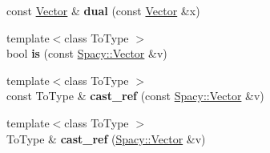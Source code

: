\begin{DoxyCompactItemize}
\item 
\hypertarget{namespaceSpacy_a58c983157e71cf6009ed046a3adea1b3}{}const \hyperlink{classSpacy_1_1Vector}{Vector} \& {\bfseries dual} (const \hyperlink{classSpacy_1_1Vector}{Vector} \&x)\label{namespaceSpacy_a58c983157e71cf6009ed046a3adea1b3}

\item 
\hypertarget{namespaceSpacy_a77116dbec86e38dd1baca8c782eab231}{}{\footnotesize template$<$class To\+Type $>$ }\\bool {\bfseries is} (const \hyperlink{classSpacy_1_1Vector}{Spacy\+::\+Vector} \&v)\label{namespaceSpacy_a77116dbec86e38dd1baca8c782eab231}

\item 
\hypertarget{namespaceSpacy_aaaa7aa09b09fc4d390ab0fb11eb2c202}{}{\footnotesize template$<$class To\+Type $>$ }\\const To\+Type \& {\bfseries cast\+\_\+ref} (const \hyperlink{classSpacy_1_1Vector}{Spacy\+::\+Vector} \&v)\label{namespaceSpacy_aaaa7aa09b09fc4d390ab0fb11eb2c202}

\item 
\hypertarget{namespaceSpacy_a8de857176661184311b04035c1e39850}{}{\footnotesize template$<$class To\+Type $>$ }\\To\+Type \& {\bfseries cast\+\_\+ref} (\hyperlink{classSpacy_1_1Vector}{Spacy\+::\+Vector} \&v)\label{namespaceSpacy_a8de857176661184311b04035c1e39850}


\end{DoxyCompactItemize}
